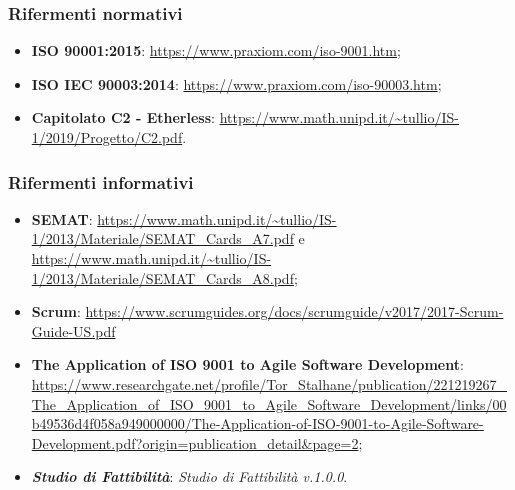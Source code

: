 \subsubsection{Rifermenti normativi}
\begin{itemize}
  \item \textbf{ISO 90001:2015}: \url{https://www.praxiom.com/iso-9001.htm};
  \item \textbf{ISO IEC 90003:2014}:  \url{https://www.praxiom.com/iso-90003.htm};
  \item \textbf{Capitolato C2 - Etherless}: \url{https://www.math.unipd.it/~tullio/IS-1/2019/Progetto/C2.pdf}.
\end{itemize}

\subsubsection{Rifermenti informativi}
\begin{itemize}
  \item \textbf{SEMAT}: \url{https://www.math.unipd.it/~tullio/IS-1/2013/Materiale/SEMAT_Cards_A7.pdf} e
  \url{https://www.math.unipd.it/~tullio/IS-1/2013/Materiale/SEMAT_Cards_A8.pdf};
  \item \textbf{Scrum}: \url{https://www.scrumguides.org/docs/scrumguide/v2017/2017-Scrum-Guide-US.pdf}
  \item \textbf{The Application of ISO 9001 to Agile Software Development}: \url{https://www.researchgate.net/profile/Tor_Stalhane/publication/221219267_The_Application_of_ISO_9001_to_Agile_Software_Development/links/00b49536d4f058a949000000/The-Application-of-ISO-9001-to-Agile-Software-Development.pdf?origin=publication_detail&page=2};
  \item \textbf{\textit{Studio di Fattibilità\docs}}: \textit{Studio di Fattibilità v.1.0.0}.

\end{itemize}
